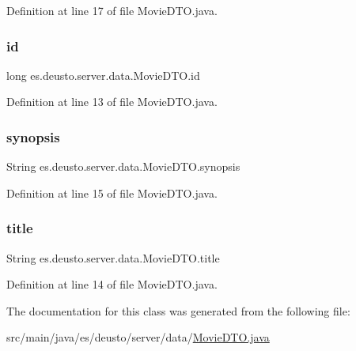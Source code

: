 Definition at line 17 of file Movie\+D\+T\+O.\+java.

\mbox{\label{classes_1_1deusto_1_1server_1_1data_1_1_movie_d_t_o_a10965da25463f1f31f577279a8f42d88}} 
\subsubsection{\texorpdfstring{id}{id}}
{\footnotesize\ttfamily long es.\+deusto.\+server.\+data.\+Movie\+D\+T\+O.\+id}



Definition at line 13 of file Movie\+D\+T\+O.\+java.

\mbox{\label{classes_1_1deusto_1_1server_1_1data_1_1_movie_d_t_o_a0d2474dd25e99046fdb05287ebd866b6}} 
\subsubsection{\texorpdfstring{synopsis}{synopsis}}
{\footnotesize\ttfamily String es.\+deusto.\+server.\+data.\+Movie\+D\+T\+O.\+synopsis}



Definition at line 15 of file Movie\+D\+T\+O.\+java.

\mbox{\label{classes_1_1deusto_1_1server_1_1data_1_1_movie_d_t_o_a09c5f5a8f9408f34e339e7149152839d}} 
\subsubsection{\texorpdfstring{title}{title}}
{\footnotesize\ttfamily String es.\+deusto.\+server.\+data.\+Movie\+D\+T\+O.\+title}



Definition at line 14 of file Movie\+D\+T\+O.\+java.



The documentation for this class was generated from the following file\+:\begin{DoxyCompactItemize}
\item 
src/main/java/es/deusto/server/data/\mbox{\hyperlink{_movie_d_t_o_8java}{Movie\+D\+T\+O.\+java}}\end{DoxyCompactItemize}
